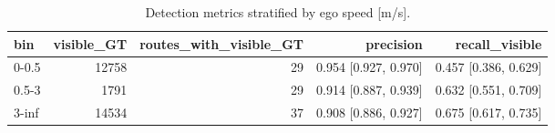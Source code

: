 \begin{table}[t]
\centering
\small
\begin{tabular}{lrrrr}
\toprule
bin & visible\_GT & routes\_with\_visible\_GT & precision & recall\_visible \\
\midrule
0-0.5 & 12758 & 29 & 0.954 [0.927, 0.970] & 0.457 [0.386, 0.629] \\
0.5-3 & 1791 & 29 & 0.914 [0.887, 0.939] & 0.632 [0.551, 0.709] \\
3-inf & 14534 & 37 & 0.908 [0.886, 0.927] & 0.675 [0.617, 0.735] \\
\bottomrule
\end{tabular}
\caption{Detection metrics stratified by ego speed [m/s].}
\label{tab:byspeed}
\end{table}

